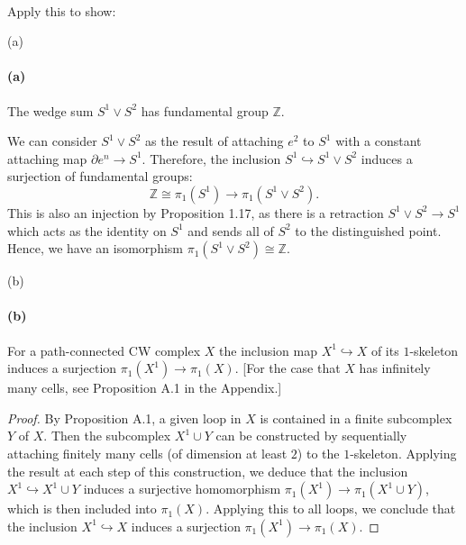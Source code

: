 \documentclass[12pt]{article}
\newlength{\myparskip}
\newenvironment{fullbox}{\begin{lrbox}{\savefullbox}\begin{minipage}{\dimexpr\textwidth-2\fboxsep\relax}\setlength{\parskip}{\myparskip}}{\end{minipage}\end{lrbox}\framebox[\textwidth]{\usebox{\savefullbox}}}
\newenvironment{pbox}[1][]{\begin{fullbox}\ifx#1\empty\else\paragraph{#1}\phantom{}\fi}{\end{fullbox}}
\theoremstyle{definition}
\newcommand{\Z}{\mathbb{Z}}
\newcommand{\<}{\langle}
\renewcommand{\>}{\rangle}
\newcommand{\isom}{\cong}
\newcommand{\inc}{\hookrightarrow}
\newcommand{\bd}{\partial}
\begin{document}
\begin{pbox}
    Apply this to show:
\end{pbox}

\begin{pbox}[(a)]
    The wedge sum $S^1 \vee S^2$ has fundamental group $\Z$.
\end{pbox}

We can consider $S^1 \vee S^2$ as the result of attaching $e^2$ to $S^1$ with a constant attaching map $\bd e^n \to S^1$.
Therefore, the inclusion $S^1 \inc S^1 \vee S^2$ induces a surjection of fundamental groups:
\[
    \Z \isom \pi_1(S^1) \longrightarrow \pi_1(S^1 \vee S^2).
\]
This is also an injection by Proposition 1.17, as there is a retraction $S^1 \vee S^2 \to S^1$ which acts as the identity on $S^1$ and sends all of $S^2$ to the distinguished point.
Hence, we have an isomorphism $\pi_1(S^1 \vee S^2) \isom \Z$.

\begin{pbox}[(b)]
    For a path-connected CW complex $X$ the inclusion map $X^1 \inc X$ of its $1$-skeleton induces a surjection $\pi_1(X^1) \to \pi_1(X)$.
    [For the case that $X$ has infinitely many cells, see Proposition A.1 in the Appendix.]
\end{pbox}

\begin{proof}
    By Proposition A.1, a given loop in $X$ is contained in a finite subcomplex $Y$ of $X$.
    Then the subcomplex $X^1 \cup Y$ can be constructed by sequentially attaching finitely many cells (of dimension at least $2$) to the $1$-skeleton.
    Applying the result at each step of this construction, we deduce that the inclusion $X^1 \inc X^1 \cup Y$ induces a surjective homomorphism $\pi_1(X^1) \to \pi_1(X^1 \cup Y)$, which is then included into $\pi_1(X)$.
    Applying this to all loops, we conclude that the inclusion $X^1 \inc X$ induces a surjection $\pi_1(X^1) \to \pi_1(X)$.
\end{proof}
\end{document}
